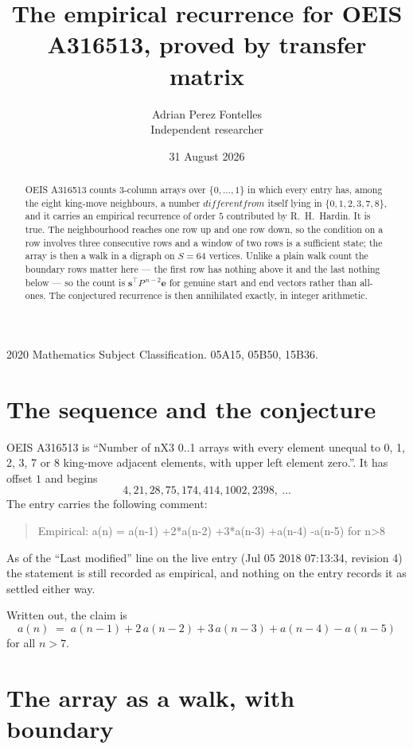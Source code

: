 \documentclass[11pt,a4paper]{article}
\title{The empirical recurrence for OEIS A316513, proved by transfer matrix}
\author{Adrian Perez Fontelles\\ \small Independent researcher}
\date{31 August 2026}
\theoremstyle{plain}
\theoremstyle{definition}
\begin{document}
\maketitle

\begin{abstract}
OEIS A316513 counts $3$-column arrays over $\{0,\dots,1\}$ in which every entry has,
among the eight king-move neighbours, a number $different from$ itself lying in $\{0,1,2,3,7,8\}$, and it carries an empirical
recurrence of order $5$ contributed by R.~H.~Hardin. It is true. The neighbourhood
reaches one row up and one row down, so the condition on a row involves three consecutive
rows and a window of two rows is a sufficient state; the array is then a walk in a digraph
on $S=64$ vertices. Unlike a plain walk count the boundary rows matter here --- the first
row has nothing above it and the last nothing below --- so the count is
$\mathbf{s}^{\!\top}P^{\,n-2}\mathbf{e}$ for genuine start and end vectors rather than
all-ones. The conjectured recurrence is then annihilated exactly, in integer arithmetic.
\end{abstract}

\noindent\small 2020 Mathematics Subject Classification. 05A15, 05B50, 15B36.\normalsize

\section{The sequence and the conjecture}

OEIS A316513 is ``Number of nX3 0..1 arrays with every element unequal to 0, 1, 2, 3, 7 or 8 king-move adjacent elements, with upper left element zero.''. It has offset
$1$ and begins
\[
4, 21, 28, 75, 174, 414, 1002, 2398,\ \dots
\]
The entry carries the following comment:
\begin{quote}\small
Empirical: a(n) = a(n-1) +2*a(n-2) +3*a(n-3) +a(n-4) -a(n-5) for n>8
\end{quote}
As of the ``Last modified'' line on the live entry (Jul 05 2018 07:13:34, revision
4) the statement is still recorded as empirical, and nothing on the entry
records it as settled either way.

Written out, the claim is
\begin{equation}\label{eq:conj}
a(n)\;=\;a(n-1) + 2\,a(n-2) + 3\,a(n-3) + a(n-4) - a(n-5)
\end{equation}
for all $n>7$.

\section{The array as a walk, with boundary}
\end{document}

